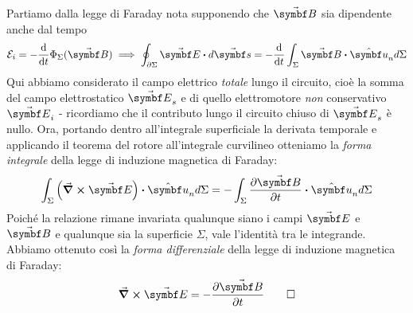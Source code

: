 \begin{demonstration}
	Partiamo dalla legge di Faraday nota supponendo che $\vba{B}$ sia dipendente anche dal tempo 
	\begin{equation*}
		\mathcal{E}_i=-\dv{t}\Phi_\Sigma(\vba{B})\implies \oint_{\partial \Sigma} \vba{E}\vdot d\vba{s}=-\dv{t}\int_{\Sigma}\vba{B}\vdot \vbh{u}_nd\Sigma
	\end{equation*}
	Qui abbiamo considerato il campo elettrico \textit{totale} lungo il circuito, cioè la somma del campo elettrostatico $\vba{E}_s$ e di quello elettromotore \textit{non} conservativo $\vba{E}_i$ - ricordiamo che il contributo lungo il circuito chiuso di $\vba{E}_s$ è nullo. Ora, portando dentro all'integrale superficiale la derivata temporale e applicando il teorema del rotore all'integrale curvilineo otteniamo la \textit{forma integrale} della legge di induzione magnetica di Faraday:
	\begin{equation*}
		\int_{\Sigma}\left(\curl{\vba{E}}\right)\vdot\vbh{u}_nd\Sigma=-\int_{\Sigma}\pdv{\vba{B}}{t}\vdot\vbh{u}_nd\Sigma
	\end{equation*}
	Poiché la relazione rimane invariata qualunque siano i campi $\vba{E}$ e $\vba{B}$ e qualunque sia la superficie $\Sigma$, vale l'identità tra le integrande. Abbiamo ottenuto così la \textit{forma differenziale} della legge di induzione magnetica di Faraday:
	\begin{equation*}
		\curl{\vba{E}}=-\pdv{\vba{B}}{t}\qedhere
	\end{equation*}
\end{demonstration}
